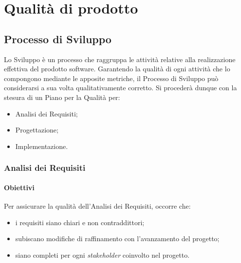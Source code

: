 \section{Qualità di prodotto}
\subsection{Processo di Sviluppo}
Lo Sviluppo è un processo che raggruppa le attività relative alla realizzazione effettiva del prodotto software. Garantendo la qualità di ogni attività che lo compongono mediante le apposite metriche, il Processo di Sviluppo può considerarsi a sua volta qualitativamente corretto. Si procederà dunque con la stesura di un Piano per la Qualità per:
\begin{itemize}
	\item Analisi dei Requisiti;
	\item Progettazione;
	\item Implementazione.
\end{itemize}
\subsubsection{Analisi dei Requisiti}
\paragraph{Obiettivi}
Per assicurare la qualità dell'Analisi dei Requisiti, occorre che:
\begin{itemize}
	\item i requisiti siano chiari e non contraddittori;
	\item subiscano modifiche di raffinamento con l'avanzamento del progetto;
	\item siano completi per ogni \textit{stakeholder\glo} coinvolto nel progetto.
\end{itemize}
